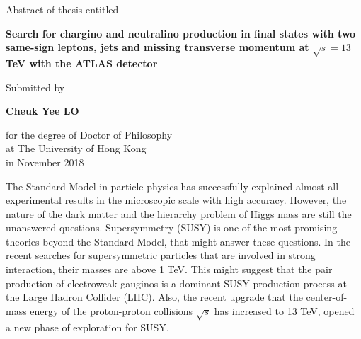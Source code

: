 {}

\begin{center}

Abstract of thesis entitled\\

\bigskip

    \huge\textbf{Search for chargino and neutralino production in final states with two same-sign leptons, jets and missing transverse momentum at $\sqrt{s} = 13$ TeV with the ATLAS detector} \\

    \bigskip

    {\normalsize Submitted by}\\

\bigskip

    \Large{\textbf{Cheuk Yee LO}}\\

\bigskip

{\normalsize
for the degree of Doctor of Philosophy\\
at The University of Hong Kong\\
in November 2018\\}

\end{center}

\bigskip

The Standard Model in particle physics has successfully explained almost all experimental results in the microscopic scale with high accuracy.
However, the nature of the dark matter and the hierarchy problem of Higgs mass are still the unanswered questions.
Supersymmetry (SUSY) is one of the most promising theories beyond the Standard Model, that might answer these questions.
In the recent searches for supersymmetric particles that are involved in strong interaction, their masses are above 1 TeV.
This might suggest that the pair production of electroweak gauginos is a dominant SUSY production process at the Large Hadron Collider (LHC).
Also, the recent upgrade that the center-of-mass energy of the proton-proton collisions $\sqrt{s}$ has increased to 13 TeV, opened a new phase of exploration for SUSY.

